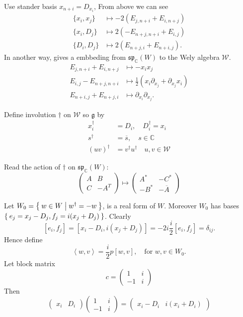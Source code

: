 \documentclass[12pt]{article}
\def\bC{{\mathbb{C}}}
\def\sp{{\mathfrak{sp}}}
\def\inn#1#2{\left\langle{#1},{#2}\right\rangle}
\def\fgg{\mathfrak{g}}
\def\cww{\mathcal{W}}
\begin{document}
Use stander basis $x_{n+i} = D_{x_i}$,
From above we can see
\begin{align}
\{x_i,x_j\} &\mapsto -2 (E_{j,n+i} + E_{i,n+j})\\
\{x_i,D_j\} &\mapsto 2 (-E_{n+j,n+i}+E_{i,j})\\
\{D_i,D_j\} &\mapsto 2(E_{n+j,i}+E_{n+i,j}).
\end{align}
In another way, gives a embbeding from $\sp_\bC(W)$ to the Wely algebra $\cww$.
\begin{align}
E_{j,n+i}+E_{i,n+j} &\mapsto -x_ix_j\\
E_{i,j} - E_{n+j,n+i} &\mapsto \frac{1}{2}(x_i\partial_{x_j}+ \partial_{x_j} x_i) \\
E_{n+i,j}+ E_{n+j,i} &\mapsto \partial_{x_i}\partial_{x_j}.
\end{align}

Define involution $\dagger$ on $\cww$ so $\fgg$ by 
\begin{align*}
x_i^\dagger &= D_i,  \quad D_i^\dagger = x_i\\
s^\dagger & = \overline{s}, \quad s\in \bC \\
(uv)^\dagger &= v^\dagger u^\dagger \quad u,v\in \cww
\end{align*}


Read the action of $\dagger$ on $\sp_\bC(W)$:
\[
\begin{pmatrix}
A & B\\
C & -A^T
\end{pmatrix}
\mapsto
\begin{pmatrix}
A^* & -C^*\\
-B^* & -\overline{A}
\end{pmatrix}
\]

Let $W_0 = \Set{w\in W|w^\dagger = -w}$, is a real form of $W$.
Moreover $W_0$ has bases $\Set{e_j = x_j-D_j, f_j = i(x_j+D_j)}$. 
Clearly 
\[
[e_i,f_j] = [x_i-D_i,i(x_j+D_j)] = -2i
\frac{i}{2} [e_i,f_j] = \delta_{ij}.
\]
Hence define 
\[
\inn{w}{v} = \frac{i}{2}p[w,v], \quad \text{for } w,v\in W_0.
\] 
Let block matrix 
\[
c=\begin{pmatrix}
1 & i\\
-1 & i
\end{pmatrix}
\]
Then 
\[
\begin{pmatrix}
x_i & D_i
\end{pmatrix}
\begin{pmatrix}
1 & i\\
-1 & i
\end{pmatrix}
= 
\begin{pmatrix}
x_i-D_i & i(x_i + D_i)
\end{pmatrix}
\]
\end{document}
